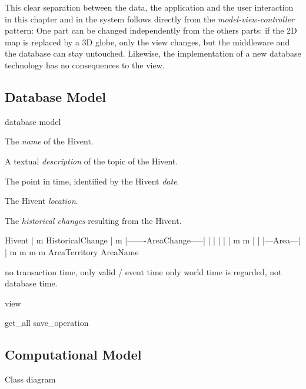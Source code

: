 This clear separation between the data, the application and the user interaction in this chapter and in the system follows directly from the \emph{model-view-controller} pattern: One part can be changed independently from the others parts: if the 2D map is replaced by a 3D globe, only the view changes, but the middleware and the database can stay untouched. Likewise, the implementation of a new database technology has no consequences to the view.


\subsection{Database Model} %
\label{sub:database_model}

database model

\begin{compactenum}
  \item The \emph{name} of the Hivent.
  \item A textual \emph{description} of the topic of the Hivent.
  \item The point in time, identified by the Hivent \emph{date}.
  \item The Hivent \emph{location}.
  \item The \emph{historical changes} resulting from the Hivent.
\end{compactenum}


           Hivent
             |
             m
       HistoricalChange
             |
             m
  |-------AreaChange-----|
  |         |  |         |
  |         m  m         |
  |     |---Area---|     |
  m     m          m     m
AreaTerritory      AreaName

no transaction time, only valid / event time
only world time is regarded, not database time.

view

get\_all
save\_operation



\subsection{Computational Model} %
\label{sub:computational_model}

Class diagram

